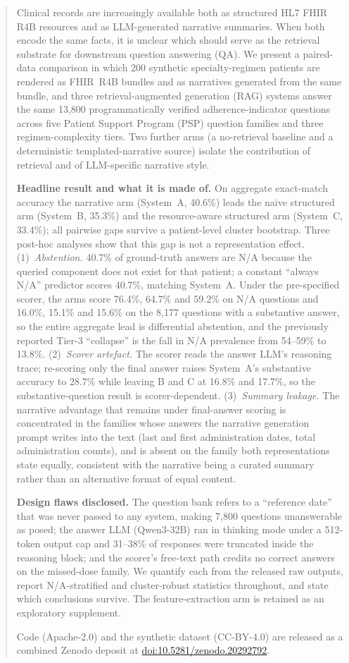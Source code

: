 \begin{abstract}
Clinical records are increasingly available both as structured HL7 FHIR R4B resources and
as LLM-generated narrative summaries.  When both encode the same facts, it is unclear which
should serve as the retrieval substrate for downstream question answering (QA).  We present
a paired-data comparison in which 200 synthetic specialty-regimen patients are rendered as
FHIR~R4B bundles and as narratives generated from the same bundle, and three
retrieval-augmented generation (RAG) systems answer the same 13,800 programmatically
verified adherence-indicator questions across five Patient Support Program (PSP) question
families and three regimen-complexity tiers.  Two further arms (a no-retrieval baseline
and a deterministic templated-narrative source) isolate the contribution of retrieval and
of LLM-specific narrative style.

\textbf{Headline result and what it is made of.}  On aggregate exact-match accuracy the
narrative arm (System~A, 40.6\%) leads the naive structured arm (System~B, 35.3\%) and the
resource-aware structured arm (System~C, 33.4\%); all pairwise gaps survive a patient-level
cluster bootstrap.  Three post-hoc analyses show that this gap is not a representation
effect.  (1)~\emph{Abstention.}  40.7\% of ground-truth answers are N/A because the
queried component does not exist for that patient; a constant ``always N/A'' predictor
scores 40.7\%, matching System~A.  Under the pre-specified scorer, the arms score 76.4\%,
64.7\% and 59.2\% on N/A questions and 16.0\%, 15.1\% and 15.6\% on the 8,177 questions
with a substantive answer, so the entire aggregate lead is differential abstention, and the
previously reported Tier-3 ``collapse'' is the fall in N/A prevalence from 54--59\% to
13.8\%.  (2)~\emph{Scorer artefact.}  The scorer reads the answer LLM's reasoning trace;
re-scoring only the final answer raises System~A's substantive accuracy to 28.7\% while
leaving B and C at 16.8\% and 17.7\%, so the substantive-question result is
scorer-dependent.  (3)~\emph{Summary leakage.}  The narrative advantage that remains under
final-answer scoring is concentrated in the families whose answers the narrative
generation prompt writes into the text (last and first administration dates, total
administration counts), and is absent on the family both representations state equally,
consistent with the narrative being a curated summary rather than an alternative format
of equal content.

\textbf{Design flaws disclosed.}  The question bank refers to a ``reference date'' that
was never passed to any system, making 7,800 questions unanswerable as posed; the answer
LLM (Qwen3-32B) ran in thinking mode under a 512-token output cap and 31--38\% of
responses were truncated inside the reasoning block; and the scorer's free-text path
credits no correct answers on the missed-dose family.  We quantify each from the released
raw outputs, report N/A-stratified and cluster-robust statistics throughout, and state
which conclusions survive.  The feature-extraction arm is retained as an exploratory
supplement.

Code (Apache-2.0) and the synthetic dataset (CC-BY-4.0) are released as a combined Zenodo
deposit at \href{https://doi.org/10.5281/zenodo.20292792}{doi:10.5281/zenodo.20292792}.
\end{abstract}
